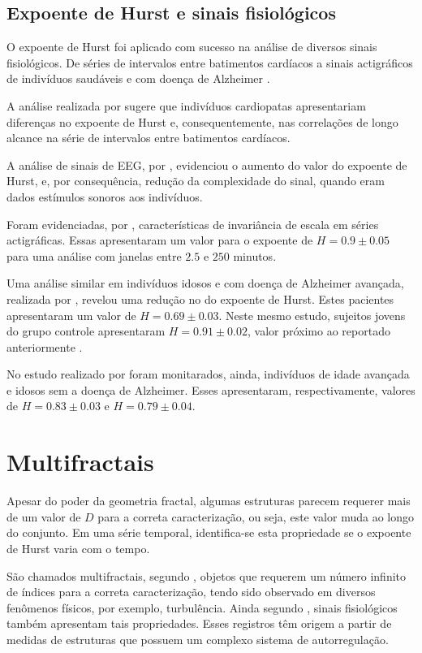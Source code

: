 \documentclass{ufscThesis}
\begin{document}
\subsection{Expoente de Hurst e sinais fisiológicos}

O expoente de Hurst foi aplicado com sucesso na análise de diversos sinais fisiológicos. De séries de intervalos entre batimentos cardíacos \cite{Peng1995} a sinais actigráficos de indivíduos saudáveis \cite{Hu2004} e com doença de Alzheimer \cite{Hu2009}. \par
A análise realizada por  sugere que indivíduos cardiopatas apresentariam diferenças no expoente de Hurst e, consequentemente, nas correlações de longo alcance na série de intervalos entre batimentos cardíacos. \par
A análise de sinais de EEG, por , evidenciou o aumento do valor do expoente de Hurst, e, por consequência, redução da complexidade do sinal, quando eram dados estímulos sonoros aos indivíduos.\par
Foram evidenciadas, por , características de invariância de escala em séries actigráficas. Essas apresentaram um valor para o expoente de $H = 0.9 \pm 0.05$ para uma análise com janelas entre $2.5$ e $250$ minutos. \par
Uma análise similar em indivíduos idosos e com doença de Alzheimer avançada, realizada por , revelou uma redução no do expoente de Hurst. Estes pacientes apresentaram um valor de $H = 0.69 \pm 0.03$. Neste mesmo estudo, sujeitos jovens do grupo controle apresentaram $H = 0.91 \pm 0.02$, valor próximo ao reportado anteriormente \cite{Hu2004}. \par
No estudo realizado por  foram monitarados, ainda, indivíduos de idade avançada e idosos sem a doença de Alzheimer. Esses apresentaram, respectivamente, valores de $H = 0.83 \pm 0.03$ e $H = 0.79 \pm 0.04$.

\section{Multifractais}

Apesar do poder da geometria fractal, algumas estruturas parecem requerer mais de um valor de $D$ para a correta caracterização, ou seja, este valor muda ao longo do conjunto. Em uma série temporal, identifica-se esta propriedade se o expoente de Hurst varia com o tempo.\par
São chamados multifractais, segundo , objetos que requerem um número infinito de índices para a correta caracterização, tendo sido observado em diversos fenômenos físicos, por exemplo, turbulência.
Ainda segundo , sinais fisiológicos também apresentam tais propriedades. Esses registros têm origem a partir de medidas de estruturas que possuem um complexo sistema de autorregulação.
\end{document}
